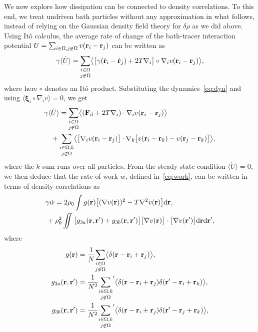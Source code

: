 \documentclass[pre, superscriptaddress, twocolumn,pre]{revtex4-1}
\newcommand{\dd}{\text{d}}
\begin{document}
We now explore how dissipation can be connected to density correlations. To this end, we treat undriven bath particles without any approximation in what follows, instead of relying on the Gaussian density field theory for $\delta\rho$ as we did above. Using It\^o calculus, the average rate of change of the bath-tracer interaction potential $U = \sum_{i\in\Omega,j\not\in\Omega} v({\bf r}_i-{\bf r}_j)$ can be written as
\begin{equation}
	\gamma\langle\dot U \rangle = \underset{j\not\in\Omega}{\sum_{i\in\Omega}} \big\langle\big[\gamma(\dot{\bf r}_i - \dot{\bf r}_j) + 2 T \nabla_i\big] \circ \nabla_i v({\bf r}_i-{\bf r}_j)\big\rangle ,
\end{equation}
where here $\circ$ denotes an It\^o product. Substituting the dynamics~\eqref{eq:dyn} and using $\langle{\boldsymbol\xi}_i\circ\nabla_i v\rangle=0$, we get
\begin{equation}\label{eq:dotU}
	\begin{aligned}
		\gamma\langle&\dot U \rangle = \underset{j\not\in\Omega}{\sum_{i\in\Omega}} \big\langle({\bf F}_{\rm d} + 2 T \nabla_i) \cdot \nabla_i v({\bf r}_i-{\bf r}_j)\big\rangle
		\\
		& + \underset{j\not\in\Omega}{\sum_{i\in\Omega,k}} \big\langle \big[\nabla_i v({\bf r}_i-{\bf r}_j)\big]\cdot \nabla_k \big[ v({\bf r}_i-{\bf r}_k) - v({\bf r}_j-{\bf r}_k) \big] \big\rangle ,
    \end{aligned}
\end{equation}
where the $k$-sum runs over all particles. From the steady-state condition $\langle\dot U \rangle=0$, we then deduce that the rate of work $\dot w$, defined in~\eqref{eq:work}, can be written in terms of density correlations as
\begin{equation}\label{eq:balance}
	\begin{aligned}
		&\gamma\dot w = 2\rho_0 \int g({\bf r}) \big[(\nabla v({\bf r}))^2 - T \nabla^2 v({\bf r})\big] \dd{\bf r} ,
		\\
		&\, + \rho_0^2 \iint\big[ g_{3a}({\bf r}, {\bf r}') + g_{3b}({\bf r}, {\bf r}')\big]  \big[\nabla v({\bf r})\big] \cdot \big[\nabla v({\bf r}')\big] \dd{\bf r} \dd{\bf r}' ,
	\end{aligned}
\end{equation}
where
\begin{equation}
	\begin{aligned}
 		g({\bf r}) &= \frac{1}{N} \underset{j\not\in\Omega}{\sum_{i\in\Omega}} \big\langle \delta({\bf r}-{\bf r}_i+{\bf r}_j)\big\rangle ,
		\\
 		g_{3a}({\bf r},{\bf r}') &= \frac{1}{N^2} \underset{j\not\in\Omega}{\sum_{i\in\Omega,k}}' \big\langle \delta({\bf r}-{\bf r}_i+{\bf r}_j) \delta({\bf r}'-{\bf r}_i+{\bf r}_k)\big\rangle ,
		\\
 		g_{3b}({\bf r},{\bf r}') &= \frac{1}{N^2} \underset{j\not\in\Omega}{\sum_{i\in\Omega,k}}' \big\langle \delta({\bf r}-{\bf r}_i+{\bf r}_j) \delta({\bf r}'-{\bf r}_j+{\bf r}_k)\big\rangle ,
	\end{aligned}
\end{equation}
\end{document}
